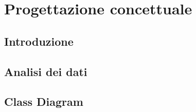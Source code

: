 \chapter{Progettazione concettuale}
\section{Introduzione}
\section{Analisi dei dati}
\section{Class Diagram}


